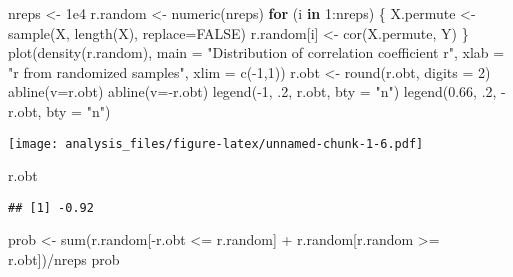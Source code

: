 \documentclass[
]{article}
\newenvironment{Shaded}{\begin{snugshade}}{\end{snugshade}}
\newcommand{\AttributeTok}[1]{\textcolor[rgb]{0.77,0.63,0.00}{#1}}
\newcommand{\ConstantTok}[1]{\textcolor[rgb]{0.00,0.00,0.00}{#1}}
\newcommand{\ControlFlowTok}[1]{\textcolor[rgb]{0.13,0.29,0.53}{\textbf{#1}}}
\newcommand{\DecValTok}[1]{\textcolor[rgb]{0.00,0.00,0.81}{#1}}
\newcommand{\FloatTok}[1]{\textcolor[rgb]{0.00,0.00,0.81}{#1}}
\newcommand{\FunctionTok}[1]{\textcolor[rgb]{0.00,0.00,0.00}{#1}}
\newcommand{\NormalTok}[1]{#1}
\newcommand{\OtherTok}[1]{\textcolor[rgb]{0.56,0.35,0.01}{#1}}
\newcommand{\SpecialCharTok}[1]{\textcolor[rgb]{0.00,0.00,0.00}{#1}}
\newcommand{\StringTok}[1]{\textcolor[rgb]{0.31,0.60,0.02}{#1}}
\begin{document}
\begin{Shaded}
\begin{Highlighting}[]
\NormalTok{nreps }\OtherTok{\textless{}{-}} \FloatTok{1e4}
\NormalTok{r.random }\OtherTok{\textless{}{-}} \FunctionTok{numeric}\NormalTok{(nreps)}
\ControlFlowTok{for}\NormalTok{ (i }\ControlFlowTok{in} \DecValTok{1}\SpecialCharTok{:}\NormalTok{nreps) \{}
\NormalTok{  X.permute }\OtherTok{\textless{}{-}} \FunctionTok{sample}\NormalTok{(X, }\FunctionTok{length}\NormalTok{(X), }\AttributeTok{replace=}\ConstantTok{FALSE}\NormalTok{)}
\NormalTok{  r.random[i] }\OtherTok{\textless{}{-}} \FunctionTok{cor}\NormalTok{(X.permute, Y)}
\NormalTok{\}}
\FunctionTok{plot}\NormalTok{(}\FunctionTok{density}\NormalTok{(r.random),}
     \AttributeTok{main =} \StringTok{"Distribution of correlation coefficient r"}\NormalTok{, }
     \AttributeTok{xlab =} \StringTok{"r from randomized samples"}\NormalTok{,}
     \AttributeTok{xlim =} \FunctionTok{c}\NormalTok{(}\SpecialCharTok{{-}}\DecValTok{1}\NormalTok{,}\DecValTok{1}\NormalTok{))}
\NormalTok{r.obt }\OtherTok{\textless{}{-}} \FunctionTok{round}\NormalTok{(r.obt, }\AttributeTok{digits =} \DecValTok{2}\NormalTok{)}
\FunctionTok{abline}\NormalTok{(}\AttributeTok{v=}\NormalTok{r.obt)}
\FunctionTok{abline}\NormalTok{(}\AttributeTok{v=}\SpecialCharTok{{-}}\NormalTok{r.obt)}
\FunctionTok{legend}\NormalTok{(}\SpecialCharTok{{-}}\DecValTok{1}\NormalTok{, .}\DecValTok{2}\NormalTok{, r.obt, }\AttributeTok{bty =} \StringTok{"n"}\NormalTok{)}
\FunctionTok{legend}\NormalTok{(}\FloatTok{0.66}\NormalTok{, .}\DecValTok{2}\NormalTok{, }\SpecialCharTok{{-}}\NormalTok{r.obt, }\AttributeTok{bty =} \StringTok{"n"}\NormalTok{)}
\end{Highlighting}
\end{Shaded}

\texttt{[image: analysis\_files/figure-latex/unnamed-chunk-1-6.pdf]}

\begin{Shaded}
\begin{Highlighting}[]
\NormalTok{r.obt}
\end{Highlighting}
\end{Shaded}

\begin{verbatim}
## [1] -0.92
\end{verbatim}

\begin{Shaded}
\begin{Highlighting}[]
\NormalTok{prob }\OtherTok{\textless{}{-}} \FunctionTok{sum}\NormalTok{(r.random[}\SpecialCharTok{{-}}\NormalTok{r.obt }\SpecialCharTok{\textless{}=}\NormalTok{ r.random] }\SpecialCharTok{+}\NormalTok{ r.random[r.random }\SpecialCharTok{\textgreater{}=}\NormalTok{ r.obt])}\SpecialCharTok{/}\NormalTok{nreps}
\NormalTok{prob}
\end{Highlighting}
\end{Shaded}
\end{document}
